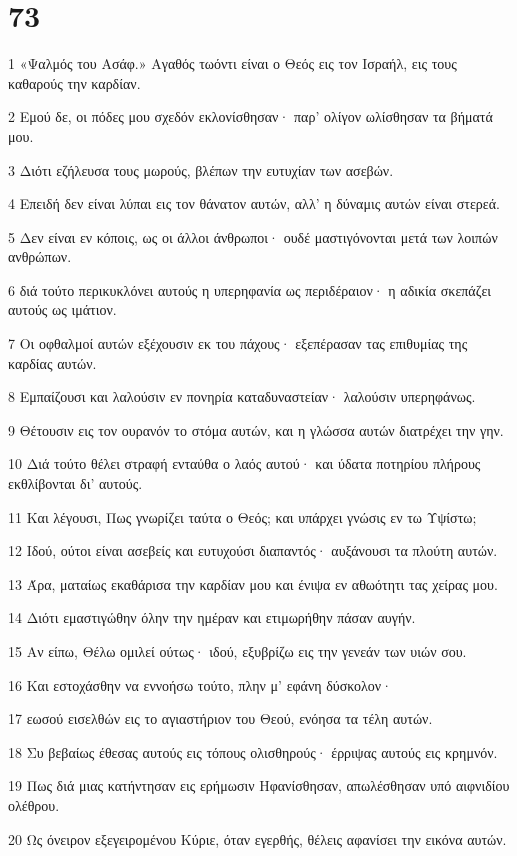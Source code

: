 \chapter{73}

\par 1 «Ψαλμός του Ασάφ.» Αγαθός τωόντι είναι ο Θεός εις τον Ισραήλ, εις τους καθαρούς την καρδίαν.
\par 2 Εμού δε, οι πόδες μου σχεδόν εκλονίσθησαν· παρ' ολίγον ωλίσθησαν τα βήματά μου.
\par 3 Διότι εζήλευσα τους μωρούς, βλέπων την ευτυχίαν των ασεβών.
\par 4 Επειδή δεν είναι λύπαι εις τον θάνατον αυτών, αλλ' η δύναμις αυτών είναι στερεά.
\par 5 Δεν είναι εν κόποις, ως οι άλλοι άνθρωποι· ουδέ μαστιγόνονται μετά των λοιπών ανθρώπων.
\par 6 διά τούτο περικυκλόνει αυτούς η υπερηφανία ως περιδέραιον· η αδικία σκεπάζει αυτούς ως ιμάτιον.
\par 7 Οι οφθαλμοί αυτών εξέχουσιν εκ του πάχους· εξεπέρασαν τας επιθυμίας της καρδίας αυτών.
\par 8 Εμπαίζουσι και λαλούσιν εν πονηρία καταδυναστείαν· λαλούσιν υπερηφάνως.
\par 9 Θέτουσιν εις τον ουρανόν το στόμα αυτών, και η γλώσσα αυτών διατρέχει την γην.
\par 10 Διά τούτο θέλει στραφή ενταύθα ο λαός αυτού· και ύδατα ποτηρίου πλήρους εκθλίβονται δι' αυτούς.
\par 11 Και λέγουσι, Πως γνωρίζει ταύτα ο Θεός; και υπάρχει γνώσις εν τω Υψίστω;
\par 12 Ιδού, ούτοι είναι ασεβείς και ευτυχούσι διαπαντός· αυξάνουσι τα πλούτη αυτών.
\par 13 Άρα, ματαίως εκαθάρισα την καρδίαν μου και ένιψα εν αθωότητι τας χείρας μου.
\par 14 Διότι εμαστιγώθην όλην την ημέραν και ετιμωρήθην πάσαν αυγήν.
\par 15 Αν είπω, Θέλω ομιλεί ούτως· ιδού, εξυβρίζω εις την γενεάν των υιών σου.
\par 16 Και εστοχάσθην να εννοήσω τούτο, πλην μ' εφάνη δύσκολον·
\par 17 εωσού εισελθών εις το αγιαστήριον του Θεού, ενόησα τα τέλη αυτών.
\par 18 Συ βεβαίως έθεσας αυτούς εις τόπους ολισθηρούς· έρριψας αυτούς εις κρημνόν.
\par 19 Πως διά μιας κατήντησαν εις ερήμωσιν Ηφανίσθησαν, απωλέσθησαν υπό αιφνιδίου ολέθρου.
\par 20 Ως όνειρον εξεγειρομένου Κύριε, όταν εγερθής, θέλεις αφανίσει την εικόνα αυτών.
